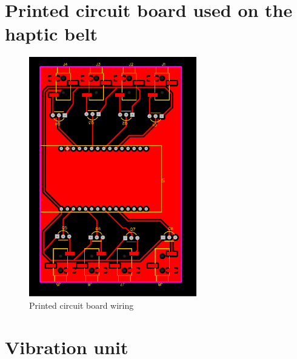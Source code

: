 

\section{Printed circuit board used on the haptic belt}

    \begin{figure}[htbp]
        \centering
        \includegraphics[width=0.65\textwidth, angle = 90, origin = c]{ApendD (Cinto)/PCB Cinto.pdf}
        \caption{Printed circuit board wiring}
        \label{pcb_wiring}
    \end{figure}
    
\pagebreak

\section{Vibration unit}

